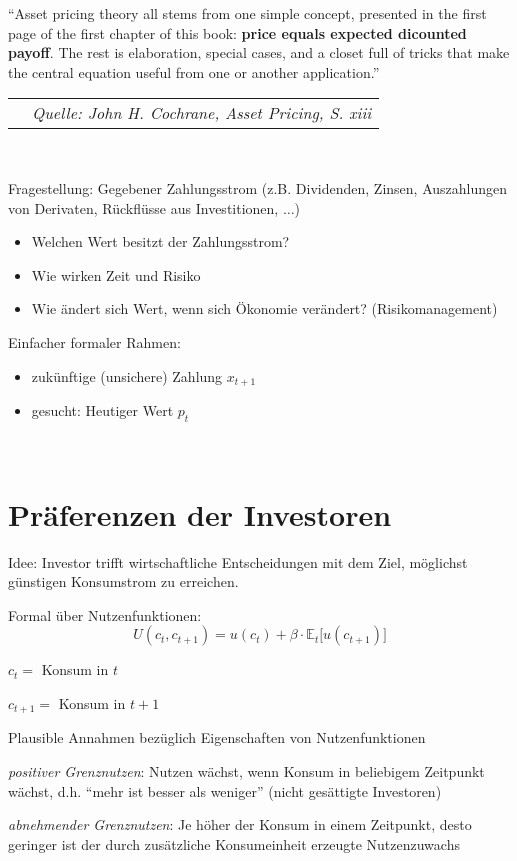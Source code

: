 \documentclass[12pt]{extreport} %
\theoremstyle{named}
\theoremstyle{nnamed}
\theoremstyle{itshape}
\theoremstyle{normal}
\begin{document}
\enquote{Asset pricing theory all stems from one simple concept, presented in the first page of the first chapter of this book: \textbf{price equals expected dicounted payoff}. The rest is elaboration, special cases, and a closet full of tricks that make the central equation useful from one or another application.} ~\\
	\begin{tabular}{lr}
  		\hspace{6.35cm} & \textit{Quelle: John H. Cochrane, Asset Pricing, S. xiii}
	\end{tabular} ~\medskip

Fragestellung: Gegebener Zahlungsstrom (z.B. Dividenden, Zinsen, Auszahlungen von Derivaten, Rückflüsse aus Investitionen, $\dotsc$)
\begin{itemize}
	\item Welchen Wert besitzt der Zahlungsstrom?
	\item Wie wirken Zeit und Risiko
	\item Wie ändert sich Wert, wenn sich Ökonomie verändert? (Risikomanagement)
\end{itemize}
Einfacher formaler Rahmen:
\begin{itemize}
	\item zukünftige (unsichere) Zahlung $x_{t+1}$
	\item gesucht: Heutiger Wert $p_t$
\end{itemize} ~\newpage

\section{Präferenzen der Investoren}

Idee: Investor trifft wirtschaftliche Entscheidungen mit dem Ziel, möglichst günstigen Konsumstrom zu erreichen. ~\bigskip

Formal über Nutzenfunktionen:
	$$ U(c_t, c_{t+1}) = u(c_t) + \beta \cdot \mathbb{E}_t\big[ u\left(c_{t+1}\right) \big] $$
\begin{description}
	\item $c_t =$ Konsum in $t$
	\item $c_{t+1} =$ Konsum in $t+1$ 
\end{description}

Plausible Annahmen bezüglich Eigenschaften von Nutzenfunktionen

\begin{description}
	\item \textit{positiver Grenznutzen}: Nutzen wächst, wenn Konsum in beliebigem Zeitpunkt wächst, d.h. \enquote{mehr ist besser als weniger} (nicht gesättigte Investoren)
	\item \textit{abnehmender Grenznutzen}: Je höher der Konsum in einem Zeitpunkt, desto geringer ist der durch zusätzliche Konsumeinheit erzeugte Nutzenzuwachs
\end{description} %
\end{document}
